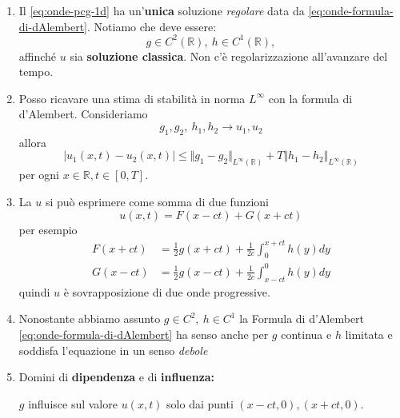 \documentclass[10pt,a4paper,twoside,openright]{book}
\begin{document}
\begin{enumerate}
	\item Il \eqref{eq:onde-pcg-1d} ha un'\textbf{unica} soluzione \textit{regolare} data da \eqref{eq:onde-formula-di-dAlembert}. Notiamo che deve essere:
		\begin{equation*}
			g\in C^{2}(\mathbb{R}) ,\ h\in C^{1}(\mathbb{R}) ,
		\end{equation*}
		affinché $\displaystyle u$ sia\textbf{ soluzione classica}. Non c'è regolarizzazione all'avanzare del tempo.
	\item Posso ricavare una stima di stabilità in norma $\displaystyle L^{\infty }$ con la formula di d'Alembert. Consideriamo
		\begin{equation*}
			g_{1} ,g_{2} ,\ h_{1} ,h_{2}\rightarrow u_{1} ,u_{2}
		\end{equation*}
		allora
		\begin{equation*}
			| u_{1}( x,t) -u_{2}( x,t)| \leqslant \Vert g_{1} -g_{2}\Vert _{L^{\infty }(\mathbb{R})} +T\Vert h_{1} -h_{2}\Vert _{L^{\infty }(\mathbb{R})}
		\end{equation*}
		per ogni $x\in \mathbb{R}, t\in [0,T]$.
	\item La $\displaystyle u$ si può esprimere come somma di due funzioni
		\begin{equation*}
			u( x,t) =F( x-ct) +G( x+ct)
		\end{equation*}
		per esempio
		\begin{align*}
			F( x+ct) & =\frac{1}{2} g( x+ct) +\frac{1}{2c}\int _{0}^{x+ct} h( y) dy \\
			G( x-ct) & =\frac{1}{2} g( x-ct) +\frac{1}{2c}\int _{x-ct}^{0} h( y) dy 
		\end{align*}
		quindi $\displaystyle u$ è sovrapposizione di due onde progressive.
	\item Nonostante abbiamo assunto $\displaystyle g\in C^{2} ,\ h\in C^{1}$ la Formula di d'Alembert \eqref{eq:onde-formula-di-dAlembert} ha senso anche per $\displaystyle g$ continua e $\displaystyle h$ limitata e soddisfa l'equazione in un senso \textit{debole}
			
	\item Domini di \textbf{dipendenza} e di \textbf{influenza:}
			
			
			$\displaystyle g$ influisce sul valore $\displaystyle u( x,t)$ solo dai punti $\displaystyle ( x-ct,0) ,( x+ct,0)$.
			

\end{enumerate}
\end{document}
